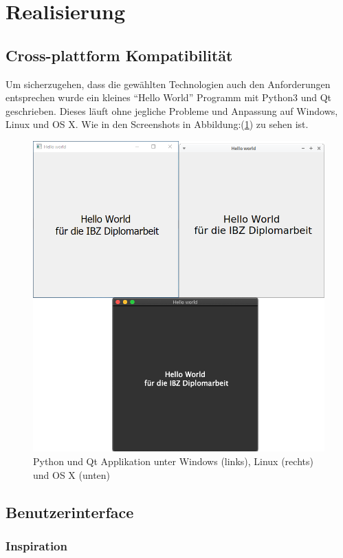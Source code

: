 \section{Realisierung}
\label{sec:orgb833f22}
\subsection{Cross-plattform Kompatibilität}
\label{sec:orgcad6880}

Um sicherzugehen, dass die gewählten Technologien auch den Anforderungen
entsprechen wurde ein kleines "`Hello World"' Programm mit Python3 und Qt
geschrieben. Dieses läuft ohne jegliche Probleme und Anpassung auf Windows,
Linux und OS X. Wie in den Screenshots in Abbildung:(\ref{fig:org8f81d9f}) zu sehen
ist.

\begin{figure}[htbp]
\centering
\includegraphics[width=.9\linewidth]{pictures/hello_world.png}
\caption{\label{fig:org8f81d9f}
Python und Qt Applikation unter Windows (links), Linux (rechts) und OS X (unten)}
\end{figure}

\subsection{Benutzerinterface}
\label{sec:org184310c}
\subsubsection{Inspiration}
\label{sec:orge74a4b2}

